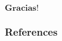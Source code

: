 \documentclass{beamer}
\begin{document}
	
\begin{frame}
\begin{center}
$\mathbf{Gracias!}$
\end{center}
\end{frame}
\begin{frame}[allowframebreaks]
	\frametitle{References}
	\nocite{*}
	
	
\end{frame}
\end{document}
